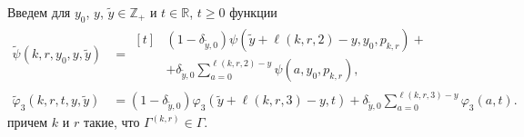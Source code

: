 \documentclass[a4paper,12pt,russian]{extarticle}
\begin{document}
Введем для $y_0$, $y$, $\tilde{y} \in \mathbb{Z}_+$ и $t \in \mathbb{R}$, $t\geqslant 0$ функции
\begin{equation}
\begin{aligned}
\widetilde{\psi}(k,r,y_0,y,\tilde{y}) &= 
\begin{aligned}[t]
&(1 - \delta_{\tilde{y},0}) \psi(\tilde{y}+\ell(k,r,2)-y,y_0, p_{k,r})  +\\
&+ \delta_{\tilde{y},0}\sum_{a=0}^{\ell(k,r,2)-y} \psi(a,y_0, p_{k,r}),
\end{aligned}\\
\widetilde{\varphi}_3(k,r,t,y,\tilde{y}) &= (1-\delta_{\tilde{y},0}) \varphi_3(\tilde{y} + \ell(k,r,3)-y,t)  +\delta_{\tilde{y},0}\sum_{a=0}^{\ell(k,r,3)-y} \varphi_3(a,t).
\end{aligned}
\label{tildephi}
\end{equation}
причем $k$ и $r$ такие, что $\Gamma^{(k,r)}\in \Gamma$.
	
\end{document}
